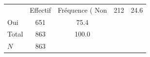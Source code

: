 {
\def\sym#1{\ifmmode^{#1}\else\(^{#1}\)\fi}
\begin{tabular}{l*{1}{cc}}
\toprule
            &    Effectif&Fréquence (%
\midrule
Non         &         212&        24.6\\
Oui         &         651&        75.4\\
Total       &         863&       100.0\\
\midrule
\(N\)       &         863&            \\
\bottomrule
\end{tabular}
}
